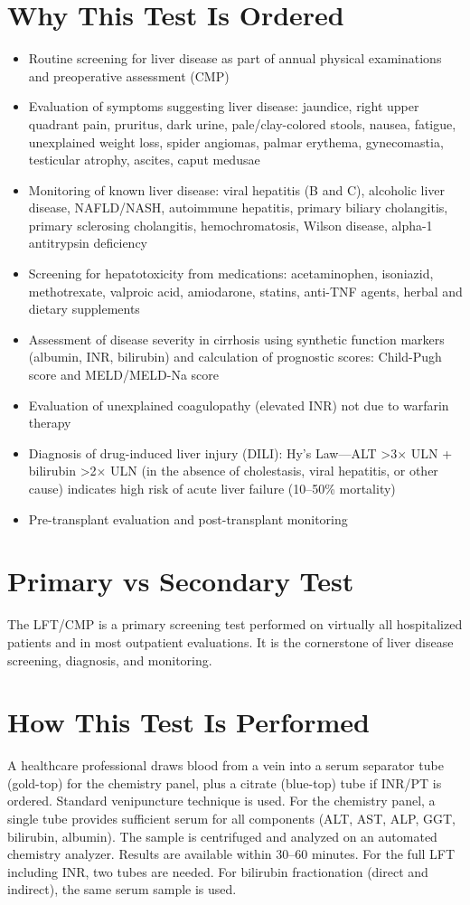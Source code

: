 \section*{Why This Test Is Ordered}
\begin{itemize}
  \item Routine screening for liver disease as part of annual physical examinations and preoperative assessment (CMP) \cite{tierney2023current}
  \item Evaluation of symptoms suggesting liver disease: jaundice, right upper quadrant pain, pruritus, dark urine, pale/clay-colored stools, nausea, fatigue, unexplained weight loss, spider angiomas, palmar erythema, gynecomastia, testicular atrophy, ascites, caput medusae
  \item Monitoring of known liver disease: viral hepatitis (B and C), alcoholic liver disease, NAFLD/NASH, autoimmune hepatitis, primary biliary cholangitis, primary sclerosing cholangitis, hemochromatosis, Wilson disease, alpha-1 antitrypsin deficiency
  \item Screening for hepatotoxicity from medications: acetaminophen, isoniazid, methotrexate, valproic acid, amiodarone, statins, anti-TNF agents, herbal and dietary supplements
  \item Assessment of disease severity in cirrhosis using synthetic function markers (albumin, INR, bilirubin) and calculation of prognostic scores: Child-Pugh score and MELD/MELD-Na score
  \item Evaluation of unexplained coagulopathy (elevated INR) not due to warfarin therapy
  \item Diagnosis of drug-induced liver injury (DILI): Hy's Law---ALT >3$\times$ ULN + bilirubin >2$\times$ ULN (in the absence of cholestasis, viral hepatitis, or other cause) indicates high risk of acute liver failure (10--50\% mortality) \cite{temple2006hys}
  \item Pre-transplant evaluation and post-transplant monitoring
\end{itemize}

\section*{Primary vs Secondary Test}
The LFT/CMP is a primary screening test performed on virtually all hospitalized patients and in most outpatient evaluations. It is the cornerstone of liver disease screening, diagnosis, and monitoring.

\section*{How This Test Is Performed}
A healthcare professional draws blood from a vein into a serum separator tube (gold-top) for the chemistry panel, plus a citrate (blue-top) tube if INR/PT is ordered. Standard venipuncture technique is used. For the chemistry panel, a single tube provides sufficient serum for all components (ALT, AST, ALP, GGT, bilirubin, albumin). The sample is centrifuged and analyzed on an automated chemistry analyzer. Results are available within 30--60 minutes. For the full LFT including INR, two tubes are needed. For bilirubin fractionation (direct and indirect), the same serum sample is used.

